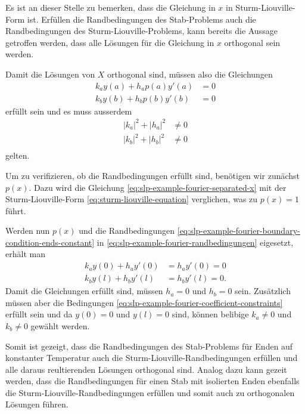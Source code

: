 Es ist an dieser Stelle zu bemerken, dass die Gleichung in $x$ in 
Sturm-Liouville-Form ist.
Erfüllen die Randbedingungen des Stab-Problems auch die Randbedingungen des
Sturm-Liouville-Problems, kann bereits die Aussage getroffen werden, dass alle
Lösungen für die Gleichung in $x$ orthogonal sein werden.

Damit die Lösungen von $X$ orthogonal sind, müssen also die Gleichungen
\begin{equation}
\begin{aligned}
	\label{eq:slp-example-fourier-randbedingungen}
	k_a y(a) + h_a p(a) y'(a) &= 0 \\
	k_b y(b) + h_b p(b) y'(b) &= 0
\end{aligned}
\end{equation}
erfüllt sein und es muss ausserdem
\begin{equation}
\begin{aligned}
    \label{eq:slp-example-fourier-coefficient-constraints}
    |k_a|^2 + |h_a|^2 &\neq 0\\
    |k_b|^2 + |h_b|^2 &\neq 0\\
\end{aligned}
\end{equation}
gelten.

Um zu verifizieren, ob die Randbedingungen erfüllt sind, benötigen wir zunächst
$p(x)$.
Dazu wird die Gleichung \eqref{eq:slp-example-fourier-separated-x} mit der
Sturm-Liouville-Form \eqref{eq:sturm-liouville-equation} verglichen, was zu
$p(x) = 1$ führt.

Werden nun $p(x)$ und die Randbedingungen
\eqref{eq:slp-example-fourier-boundary-condition-ends-constant} in
\eqref{eq:slp-example-fourier-randbedingungen} eigesetzt, erhält man
\[
\begin{aligned}
	k_a y(0) + h_a y'(0) &= h_a y'(0) = 0 \\
	k_b y(l) + h_b y'(l) &= h_b y'(l) = 0.
\end{aligned}
\]
Damit die Gleichungen erfüllt sind, müssen $h_a = 0$ und $h_b = 0$ sein.
Zusätzlich müssen aber die Bedingungen 
\eqref{eq:slp-example-fourier-coefficient-constraints} erfüllt sein und
da $y(0) = 0$ und $y(l) = 0$ sind, können belibige $k_a \neq 0$ und $k_b \neq 0$
gewählt werden.

Somit ist gezeigt, dass die Randbedingungen des Stab-Problems für Enden auf
konstanter Temperatur auch die Sturm-Liouville-Randbedingungen erfüllen und
alle daraus reultierenden Lösungen orthogonal sind.
Analog dazu kann gezeit werden, dass die Randbedingungen für einen Stab mit
isolierten Enden ebenfalls die Sturm-Liouville-Randbedingungen erfüllen und
somit auch zu orthogonalen Lösungen führen.

